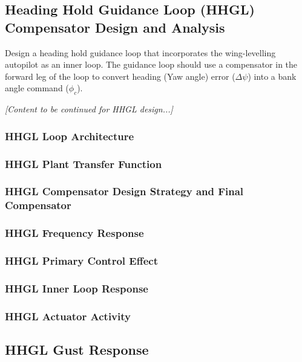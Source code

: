 \subsection{Heading Hold Guidance Loop (HHGL) Compensator Design and Analysis}

Design a heading hold guidance loop that incorporates the wing-levelling autopilot as an inner loop. The guidance loop should use a compensator in the forward leg of the loop to convert heading (Yaw angle) error ($\Delta \psi$) into a bank angle command ($\phi_c$).

\textit{[Content to be continued for HHGL design...]}

\subsubsection{HHGL Loop Architecture}

\subsubsection{HHGL Plant Transfer Function}

\subsubsection{HHGL Compensator Design Strategy and Final Compensator}

\subsubsection{HHGL Frequency Response}

\subsubsection{HHGL Primary Control Effect}

\subsubsection{HHGL Inner Loop Response}

\subsubsection{HHGL Actuator Activity}

\subsection{HHGL Gust Response}


